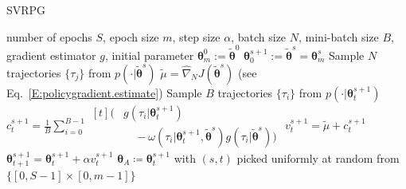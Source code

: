 \documentclass{article}
\theoremstyle{remark}
\theoremstyle{definition}
\newcommand{\vtheta}{\boldsymbol{\theta}}
\newcommand{\Reward}{\mathcal{R}}
\newcommand{\score}[2]{\nabla\log p_{#1}(#2)}
\newcommand{\gradApp}[2]{\widehat{\nabla}_{#2}J(#1)}
\newcommand{\wt}[1]{\widetilde{#1}}
\begin{document}
\begin{algorithm}[tb]
	\caption{SVRPG}
	\label{alg:svrpg}
	\begin{algorithmic}
		 number of epochs $S$, epoch size $m$, step size $\alpha$, batch size $N$, mini-batch size $B$, gradient estimator $g$, initial parameter $\vtheta_{m}^0 := \wt{\vtheta}^0$
		\STATE $\vtheta_0^{s+1} := \wt{\vtheta}^{s} = \vtheta_{m}^s$
		\STATE Sample $N$ trajectories $\{\tau_j\}$ from $p(\cdot\vert\wt{\vtheta}^{s})$
		\STATE $ \wt{\mu} = \gradApp{\wt{\vtheta}^{s}}{N}$ (see Eq.~\eqref{E:policygradient.estimate})%
		\STATE Sample $B$ trajectories $\{\tau_i\}$ from $p(\cdot\vert\vtheta_t^{s+1})$
		\STATE $c^{s+1}_t = \frac{1}{B} \sum\limits_{i=0}^{B-1}
		\begin{aligned}[t]
		\Big( & g(\tau_i|\vtheta_t^{s+1})\\ 
		& \quad{} - \omega(\tau_i|\vtheta^{s+1}_t, \wt{\vtheta}^s) g(\tau_i| \wt{\vtheta}^s) \Big)
		\end{aligned}$
		\STATE $v^{s+1}_t = \wt{\mu} + c^{s+1}_t$ %
		\STATE $\vtheta_{t+1}^{s+1} = \vtheta_t^{s+1} + \alpha v^{s+1}_t$
		\ENDFOR
		\ENDFOR
		 $\vtheta_A\coloneqq\vtheta_t^{s+1}$ with $(s,t)$ picked uniformly at random from $\{[0,S-1]\times[0,m-1]\}$
	\end{algorithmic}
\end{algorithm} 
\end{document}
